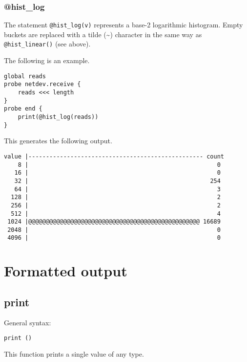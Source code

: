 \documentclass[twoside,english]{article}
\newenvironment{vindent}
{\begin{list}{}{\setlength{\listparindent}{6pt}}
\item[]}
{\end{list}}
\begin{document}
\subsubsection{@hist\_log}
The statement \texttt{@hist\_log(v)} represents a base-2 logarithmic
histogram.  Empty buckets are replaced with a tilde (\textasciitilde{})
character in the same way as \texttt{@hist\_linear()} (see above).

The following is an example.

\begin{vindent}
\begin{verbatim}
global reads
probe netdev.receive {
    reads <<< length
}
probe end {
    print(@hist_log(reads))
}
\end{verbatim}
\end{vindent}
This generates the following output.

\begin{samepage}
\begin{vindent}
\begin{verbatim}
value |-------------------------------------------------- count
    8 |                                                      0
   16 |                                                      0
   32 |                                                    254
   64 |                                                      3
  128 |                                                      2
  256 |                                                      2
  512 |                                                      4
 1024 |@@@@@@@@@@@@@@@@@@@@@@@@@@@@@@@@@@@@@@@@@@@@@@@@@ 16689
 2048 |                                                      0
 4096 |                                                      0
\end{verbatim}
\end{vindent}
\end{samepage}


\section{Formatted output}

\subsection{print}
General syntax:

\begin{vindent}
\begin{verbatim}
print ()
\end{verbatim}
\end{vindent}
This function prints a single value of any type.
\end{document}

